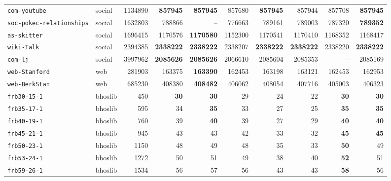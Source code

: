 \begin{table}[htbp]
{\begin{tabular}{llrrrrrrrr}
\texttt{com-youtube} & social & 1134890 & \textbf{857945} & \textbf{857945} & 857680 & \textbf{857945} & 857944 & 857708 & \textbf{857945} \\
\texttt{soc-pokec-relationships} & social & 1632803 & 788866 & -- & 776663 & 789161 & 789003 & 787320 & \textbf{789352} \\
\texttt{as-skitter} & social & 1696415 & 1170576 & \textbf{1170580} & 1152300 & 1170541 & 1170410 & 1168352 & 1168417 \\
\texttt{wiki-Talk} & social & 2394385 & \textbf{2338222} & \textbf{2338222} & 2338207 & \textbf{2338222} & \textbf{2338222} & 2338220 & \textbf{2338222} \\
\texttt{com-lj} & social & 3997962 & \textbf{2085626} & \textbf{2085626} & 2066610 & 2085604 & 2085353 & -- & 2085169 \\
\midrule
\texttt{web-Stanford} & web & 281903 & 163375 & \textbf{163390} & 162453 & 163198 & 163121 & 162453 & 162953 \\
\texttt{web-BerkStan} & web & 685230 & 408380 & \textbf{408482} & 406062 & 408054 & 407716 & 405003 & 406323 \\
\midrule
\texttt{frb30-15-1} & bhoslib & 450 & \textbf{30} & \textbf{30} & 29 & 24 & 22 & \textbf{30} & \textbf{30} \\
\texttt{frb35-17-1} & bhoslib & 595 & 34 & \textbf{35} & 33 & 27 & 25 & \textbf{35} & \textbf{35} \\
\texttt{frb40-19-1} & bhoslib & 760 & 39 & \textbf{40} & 39 & 27 & 29 & \textbf{40} & \textbf{40} \\
\texttt{frb45-21-1} & bhoslib & 945 & 43 & 43 & 42 & 33 & 32 & \textbf{45} & \textbf{45} \\
\texttt{frb50-23-1} & bhoslib & 1150 & 48 & 49 & 48 & 35 & 33 & \textbf{50} & 49 \\
\texttt{frb53-24-1} & bhoslib & 1272 & 50 & 51 & 49 & 38 & 40 & \textbf{52} & 51 \\
\texttt{frb59-26-1} & bhoslib & 1534 & 56 & 57 & 56 & 43 & 43 & \textbf{58} & 56 \\
\bottomrule
\end{tabular}}
\end{table}
